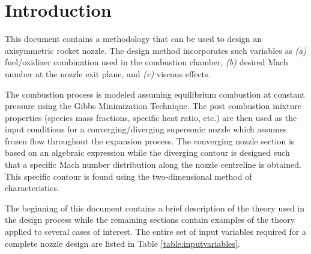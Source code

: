 \section{Introduction}

	This document contains a methodology that can be used to design an axisymmetric
rocket nozzle.  The design method incorporates such variables as \emph{(a)} fuel/oxidizer
combination used in the combustion chamber, \emph{(b)} desired Mach number at the nozzle
exit plane, and \emph{(c)} viscous effects.  

	The combustion process is modeled assuming equilibrium combustion at constant
pressure using the Gibbs Minimization Technique.  The post combustion mixture properties
(species mass fractions, specific heat ratio, etc.) are then used as the input conditions
for a converging/diverging supersonic nozzle which assumes frozen flow throughout the 
expansion process.  The converging nozzle section is based on an algebraic expression while
the diverging contour is designed such that a specific Mach number distribution along the nozzle 
centreline is obtained.  This specific contour is found using the two-dimensional method of
characteristics.

	The beginning of this document contains a brief description of the theory used in the
design process while the remaining sections contain examples of the theory applied to several 
cases of interest.  The entire set of input variables required for a complete nozzle design
are listed in Table \ref{table:inputvariables}.

